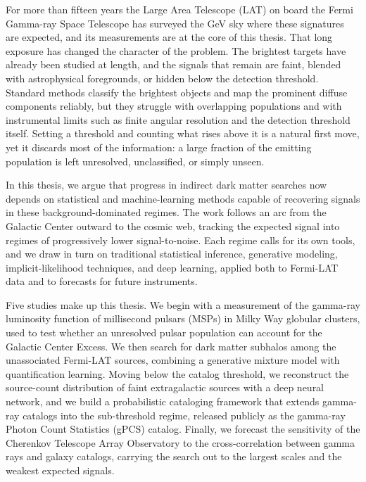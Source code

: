 For more than fifteen years the Large Area Telescope (LAT) on board the Fermi Gamma-ray Space Telescope has surveyed the GeV sky where these signatures are expected, and its measurements are at the core of this thesis. That long exposure has changed the character of the problem. The brightest targets have already been studied at length, and the signals that remain are faint, blended with astrophysical foregrounds, or hidden below the detection threshold. Standard methods classify the brightest objects and map the prominent diffuse components reliably, but they struggle with overlapping populations and with instrumental limits such as finite angular resolution and the detection threshold itself. Setting a threshold and counting what rises above it is a natural first move, yet it discards most of the information: a large fraction of the emitting population is left unresolved, unclassified, or simply unseen.

In this thesis, we argue that progress in indirect dark matter searches now depends on statistical and machine-learning methods capable of recovering signals in these background-dominated regimes. The work follows an arc from the Galactic Center outward to the cosmic web, tracking the expected signal into regimes of progressively lower signal-to-noise. Each regime calls for its own tools, and we draw in turn on traditional statistical inference, generative modeling, implicit-likelihood techniques, and deep learning, applied both to Fermi-LAT data and to forecasts for future instruments.

Five studies make up this thesis. We begin with a measurement of the gamma-ray luminosity function of millisecond pulsars (MSPs) in Milky Way globular clusters, used to test whether an unresolved pulsar population can account for the Galactic Center Excess. We then search for dark matter subhalos among the unassociated Fermi-LAT sources, combining a generative mixture model with quantification learning. Moving below the catalog threshold, we reconstruct the source-count distribution of faint extragalactic sources with a deep neural network, and we build a probabilistic cataloging framework that extends gamma-ray catalogs into the sub-threshold regime, released publicly as the gamma-ray Photon Count Statistics (gPCS) catalog. Finally, we forecast the sensitivity of the Cherenkov Telescope Array Observatory to the cross-correlation between gamma rays and galaxy catalogs, carrying the search out to the largest scales and the weakest expected signals.

